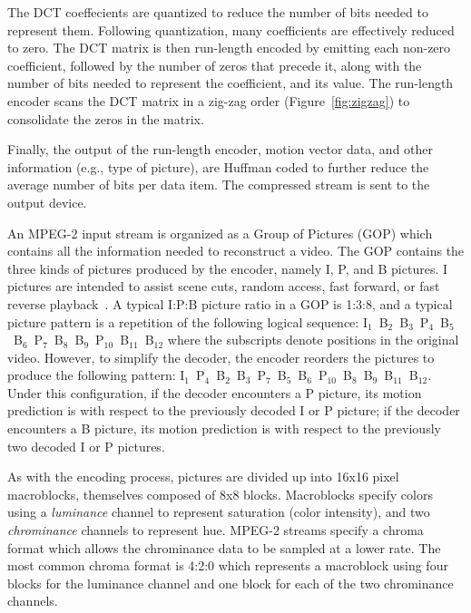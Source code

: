 The DCT coeffecients are quantized to reduce the number of bits needed
to represent them. Following quantization, many coefficients are
effectively reduced to zero. The DCT matrix is then run-length encoded
by emitting each non-zero coefficient,
followed by the number of zeros that precede it, along with the number
of bits needed to represent the coefficient, and its value. The
run-length encoder scans the DCT matrix in a zig-zag order
(Figure~\ref{fig:zigzag}) to consolidate the zeros in the matrix.

Finally, the output of the run-length encoder, motion vector data,
and other information (e.g., type of picture), are Huffman coded to 
further reduce the average number of bits per data item. The compressed
stream is sent to the output device.


An MPEG-2 input stream is organized as a Group of Pictures (GOP) which
contains all the information needed to reconstruct a video. The GOP
contains the three kinds of pictures produced by the encoder, namely
I, P, and B pictures. I pictures are intended to assist scene cuts,
random access, fast forward, or fast reverse
playback~\cite[p. 14]{MPEG2}. A typical I:P:B picture ratio in a GOP
is 1:3:8, and a typical picture pattern is a repetition of the
following logical sequence:
I$_1$~B$_2$~B$_3$~P$_4$~B$_5$~B$_6$~P$_7$~B$_8$~B$_9$~P$_{10}$~B$_{11}$~B$_{12}$
where the subscripts denote positions in the original video.  However,
to simplify the decoder, the encoder reorders the pictures to produce
the following pattern:
I$_1$~P$_4$~B$_2$~B$_3$~P$_7$~B$_5$~B$_6$~P$_{10}$~B$_8$~B$_9$~B$_{11}$~B$_{12}$.
Under this configuration, if the decoder encounters a P picture, its
motion prediction is with respect to the previously decoded I or P
picture; if the decoder encounters a B picture, its motion prediction
is with respect to the previously two decoded I or P pictures.

As with the encoding process, pictures are divided up into 16x16 pixel
macroblocks, themselves composed of 8x8 blocks. Macroblocks
specify colors using a {\it luminance} channel to represent saturation
(color intensity), and two {\it chrominance} channels to represent
hue. MPEG-2 streams specify a chroma format which allows the
chrominance data to be sampled at a lower rate. The most common chroma 
format is 4:2:0 which represents a macroblock using four blocks for the
luminance channel and one block for each of the two chrominance
channels. 

